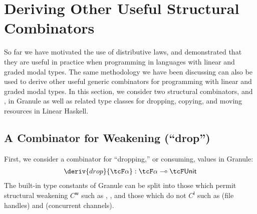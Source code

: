 \section{Deriving Other Useful Structural Combinators}
\label{sec:deriving-other}
So far we have motivated the use of distributive laws, and demonstrated that
they are useful in practice when programming in languages with linear and graded
modal types. The same methodology we have been discussing can also be used to
derive other useful generic combinators for programming with linear and graded
modal types. In this section, we consider two structural combinators,
 and , in Granule as well as related type classes
for dropping, copying, and moving resources in Linear Haskell.

\subsection{A Combinator for Weakening (``drop'')}
\label{subsec:drop}

First, we consider a combinator for ``dropping,'' or consuming, values in
Granule: 
\begin{align*}
\deriv{drop}{\tcF \alpha} : \tcF \alpha \multimap \tcF \mathsf{Unit}
\end{align*}
The built-in type constants of Granule can be split into those which permit
structural weakening $C^{\mathsf{w}}$ such as , , and those which do not $C^{\mathsf{l}}$ such as 
(file handles) and  (concurrent channels). 


